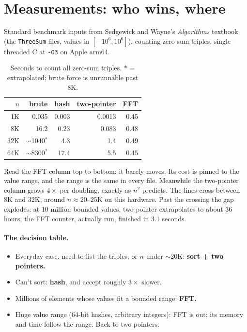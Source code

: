 \documentclass[11pt]{article}
\begin{document}
\section{Measurements: who wins, where}

Standard benchmark inputs from Sedgewick and Wayne's \emph{Algorithms}
textbook~\cite{sedgewick2011} (the \texttt{ThreeSum} files, values in
$[-10^6,10^6]$), counting zero-sum triples, single-threaded C at \texttt{-O3} on
Apple arm64.

\begin{table}[h]
\centering
\caption{Seconds to count all zero-sum triples. $*$ = extrapolated; brute force
is unrunnable past 8K.}
\begin{tabular}{rrrrr}
\toprule
$n$ & brute & hash & two-pointer & FFT\\
\midrule
1K  & 0.035        & 0.003  & 0.0013 & 0.45\\
8K  & 16.2         & 0.23   & 0.083  & 0.48\\
32K & $\sim$1040$^*$  & 4.3    & 1.4    & 0.49\\
64K & $\sim$8300$^*$  & 17.4   & 5.5    & 0.45\\
\bottomrule
\end{tabular}
\end{table}

Read the FFT column top to bottom: it barely moves. Its cost is pinned to the
value range, and the range is the same in every file. Meanwhile the two-pointer
column grows $4\times$ per doubling, exactly as $n^2$ predicts. The lines cross
between 8K and 32K, around $n \approx 20$--$25$K on this hardware. Past the
crossing the gap explodes: at 10 million bounded values, two-pointer extrapolates
to about 36 hours; the FFT counter, actually run, finished in 3.1 seconds.

\paragraph{The decision table.}

\begin{itemize}
\item Everyday case, need to list the triples, or $n$ under $\sim$20K:
      \textbf{sort + two pointers.}
\item Can't sort: \textbf{hash}, and accept roughly $3\times$ slower.
\item Millions of elements whose values fit a bounded range: \textbf{FFT.}
\item Huge value range (64-bit hashes, arbitrary integers): FFT is out; its
      memory and time follow the range. Back to two pointers.
\end{itemize}
\end{document}
